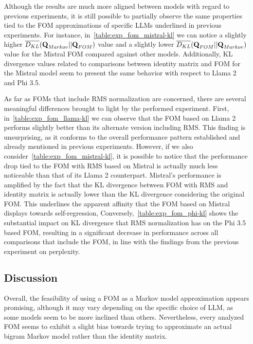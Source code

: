 Although the results are much more aligned between models with regard to previous experiments, it is still possible to partially observe the same properties tied to the FOM approximations of specific LLMs underlined in previous experiments.
For instance, in~\cref{table:exp_fom_mistral-kl} we can notice a slightly higher ${\overline {D_{KL}}}(\bm{\mathbf{Q}}_{Markov} || \bm{\mathbf{Q}}_{FOM})$ value and a slightly lower ${\overline {D_{KL}}}(\bm{\mathbf{Q}}_{FOM} || \bm{\mathbf{Q}}_{Markov})$ value for the Mistral FOM compared against other models.
Additionally, KL divergence values related to comparisons between identity matrix and FOM for the Mistral model seem to present the same behavior with respect to Llama 2 and Phi 3.5.

As far as FOMs that include RMS normalization are concerned, there are several meaningful differences brought to light by the performed experiment.
First, in~\cref{table:exp_fom_llama-kl} we can observe that the FOM based on Llama 2 performs slightly better than its alternate version including RMS\@.
This finding is unsurprising, as it conforms to the overall performance pattern established and already mentioned in previous experiments.
However, if we also consider~\cref{table:exp_fom_mistral-kl}, it is possible to notice that the performance drop tied to the FOM with RMS based on Mistral is actually much less noticeable than that of its Llama 2 counterpart.
Mistral's performance is amplified by the fact that the KL divergence between FOM with RMS and identity matrix is actually lower than the KL divergence considering the original FOM\@.
This underlines the apparent affinity that the FOM based on Mistral displays towards self-regression,
Conversely,~\cref{table:exp_fom_phi-kl} shows the substantial impact on KL divergence that RMS normalization has on the Phi 3.5 based FOM, resulting in a significant decrease in performance across all comparisons that include the FOM, in line with the findings from the previous experiment on perplexity.

\subsection{Discussion}\label{ssec:exp_fom_discussion}

Overall, the feasibility of using a FOM as a Markov model approximation appears promising, although it may vary depending on the specific choice of LLM, as some models seem to be more inclined than others.
Nevertheless, every analyzed FOM seems to exhibit a slight bias towards trying to approximate an actual bigram Markov model rather than the identity matrix.

